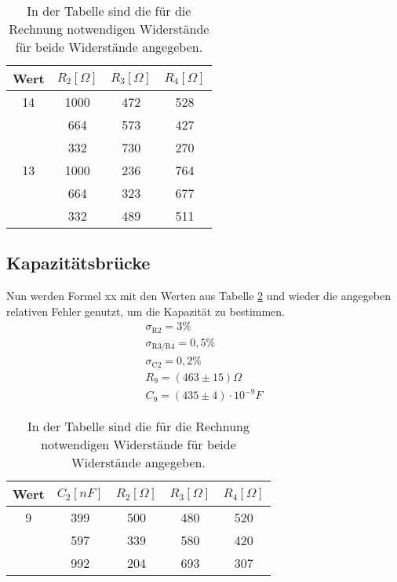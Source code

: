 \documentclass[titlepage = firstcover]{scrartcl}
\begin{document}
  \begin{table}[h]
    \centering
    \caption{In der Tabelle sind die für die Rechnung notwendigen Widerstände für beide Widerstände angegeben.}
    \label{tab:Wheaton}
    \begin{tabular}{c c c c}
      \toprule
      {Wert} & {$R_{\text{2}} [\Omega]$} & {$R_{\text{3}} [\Omega]$} & {$R_{\text{4}} [\Omega]$} \\
      \midrule 
      14 & 1000 & 472 & 528  \\
       & 664 & 573 & 427 \\
       & 332 & 730 & 270 \\
      13 & 1000 & 236 & 764 \\
       & 664 & 323 & 677 \\
       & 332 & 489 & 511 \\
      \bottomrule
    \end{tabular}
  \end{table}

  \subsection{Kapazitätsbrücke}
  Nun werden Formel xx mit den Werten aus Tabelle \ref{tab:Kap} und wieder die angegeben relativen Fehler genutzt, um die Kapazität zu bestimmen.
  \begin{align*}
    \sigma_{\text{R2}} = 3 \% \\
    \sigma_{\text{R3/R4}} = 0,5 \% \\
    \sigma_{\text{C2}} = 0,2 \% \\
    R_9 = (463 \pm 15) \Omega\\
    C_9 = (435 \pm 4) \cdot 10^{-9} F
  \end{align*}

  \begin{table}[h]
    \centering
    \caption{In der Tabelle sind die für die Rechnung notwendigen Widerstände für beide Widerstände angegeben.}
    \label{tab:Kap}
    \begin{tabular}{c c c c c}
      \toprule
      {Wert} & {$C_{\text{2}} [nF]$} & {$R_{\text{2}} [\Omega]$} & {$R_{\text{3}} [\Omega]$} & {$R_{\text{4}} [\Omega]$} \\
      \midrule 
      9 & 399 & 500 & 480 & 520  \\
       & 597 & 339 & 580 & 420 \\
       & 992 & 204 & 693 & 307 \\
      \bottomrule
    \end{tabular}
  \end{table}
\end{document}
